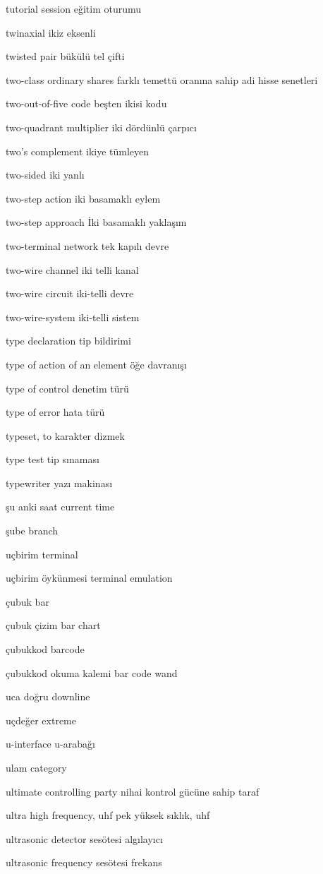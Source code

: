 \documentclass[12pt,fleqn]{article}\usepackage{../../common}
\begin{document}
tutorial session eğitim oturumu

twinaxial ikiz eksenli

twisted pair bükülü tel çifti

two-class ordinary shares farklı temettü oranına sahip adi hisse senetleri

two-out-of-five code beşten ikisi kodu

two-quadrant multiplier iki dördünlü çarpıcı

two's complement ikiye tümleyen

two-sided iki yanlı

two-step action iki basamaklı eylem

two-step approach İki basamaklı yaklaşım

two-terminal network tek kapılı devre

two-wire channel iki telli kanal

two-wire circuit iki-telli devre

two-wire-system iki-telli sistem

type declaration tip bildirimi

type of action of an element öğe davranışı

type of control denetim türü

type of error hata türü

typeset, to karakter dizmek

type test tip sınaması

typewriter yazı makinası

şu anki saat current time

şube branch

uçbirim terminal

uçbirim öykünmesi terminal emulation

çubuk bar

çubuk çizim bar chart

çubukkod barcode

çubukkod okuma kalemi bar code wand

uca doğru downline

uçdeğer extreme

u-interface u-arabağı

ulam category

ultimate controlling party nihai kontrol gücüne sahip taraf

ultra high frequency, uhf pek yüksek sıklık, uhf

ultrasonic detector sesötesi algılayıcı

ultrasonic frequency sesötesi frekans
\end{document}
